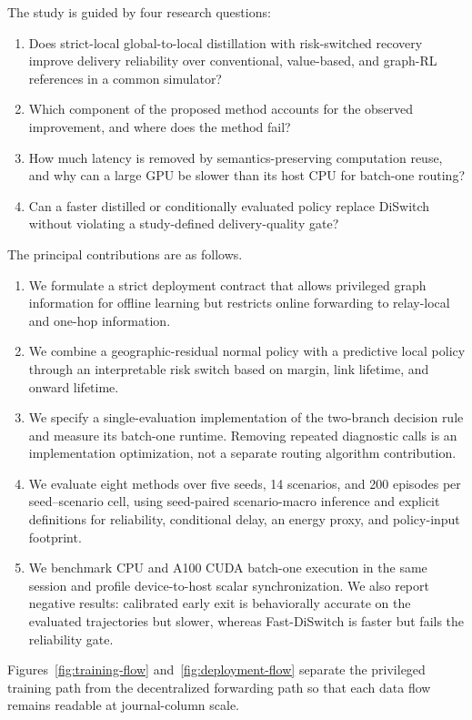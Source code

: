 \documentclass{ieeeaccess}
\newcommand{\DS}{DiSwitch}
\newcommand{\FastDS}{Fast-DiSwitch}
\begin{document}
The study is guided by four research questions:
\begin{enumerate}[leftmargin=*]
\item Does strict-local global-to-local distillation with risk-switched recovery improve delivery reliability over conventional, value-based, and graph-RL references in a common simulator?
\item Which component of the proposed method accounts for the observed improvement, and where does the method fail?
\item How much latency is removed by semantics-preserving computation reuse, and why can a large GPU be slower than its host CPU for batch-one routing?
\item Can a faster distilled or conditionally evaluated policy replace \DS{} without violating a study-defined delivery-quality gate?
\end{enumerate}

The principal contributions are as follows.
\begin{enumerate}[leftmargin=*]
\item We formulate a strict deployment contract that allows privileged graph information for offline learning but restricts online forwarding to relay-local and one-hop information.
\item We combine a geographic-residual normal policy with a predictive local policy through an interpretable risk switch based on margin, link lifetime, and onward lifetime.
\item We specify a single-evaluation implementation of the two-branch decision rule and measure its batch-one runtime. Removing repeated diagnostic calls is an implementation optimization, not a separate routing algorithm contribution.
\item We evaluate eight methods over five seeds, 14 scenarios, and 200 episodes per seed--scenario cell, using seed-paired scenario-macro inference and explicit definitions for reliability, conditional delay, an energy proxy, and policy-input footprint.
\item We benchmark CPU and A100 CUDA batch-one execution in the same session and profile device-to-host scalar synchronization. We also report negative results: calibrated early exit is behaviorally accurate on the evaluated trajectories but slower, whereas \FastDS{} is faster but fails the reliability gate.
\end{enumerate}

Figures~\ref{fig:training-flow} and~\ref{fig:deployment-flow} separate the privileged training path from the decentralized forwarding path so that each data flow remains readable at journal-column scale.
\end{document}
